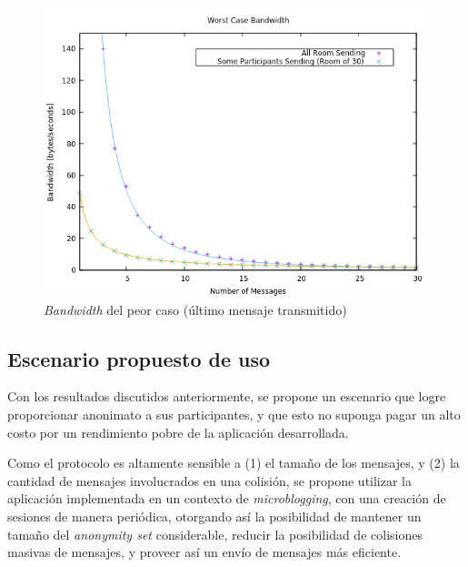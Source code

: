 \begin{figure}[H]
  \centering
    \includegraphics[scale=0.7]{logs/bandwidth.png}
  \caption{\emph{Bandwidth} del peor caso (último mensaje transmitido)}
  \label{fig:bandwidth}
\end{figure}

\subsection{Escenario propuesto de uso}

Con los resultados discutidos anteriormente, se propone un escenario que logre 
proporcionar anonimato a sus participantes, y que esto no suponga pagar un 
alto costo por un rendimiento pobre de la aplicación desarrollada.

Como el protocolo es altamente sensible a (1) el tamaño de los mensajes, y (2) 
la cantidad de mensajes involucrados en una colisión, se propone utilizar la 
aplicación implementada en un contexto de \emph{microblogging}, con una 
creación de sesiones de manera periódica, otorgando así la posibilidad de 
mantener un tamaño del \emph{anonymity set} considerable, reducir la 
posibilidad de colisiones masivas de mensajes, y proveer así un envío de 
mensajes más eficiente.

